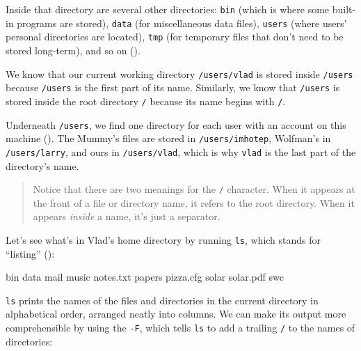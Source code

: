 \documentclass{book}
\begin{document}
Inside that directory are several other directories: \texttt{bin} (which
is where some built-in programs are stored), \texttt{data} (for
miscellaneous data files), \texttt{users} (where users' personal
directories are located), \texttt{tmp} (for temporary files that don't
need to be stored long-term), and so on ().


We know that our current working directory \texttt{/users/vlad} is
stored inside \texttt{/users} because \texttt{/users} is the first part
of its name. Similarly, we know that \texttt{/users} is stored inside
the root directory \texttt{/} because its name begins with \texttt{/}.

Underneath \texttt{/users}, we find one directory for each user with an
account on this machine (). The Mummy's files are stored in
\texttt{/users/imhotep}, Wolfman's in \texttt{/users/larry}, and ours in
\texttt{/users/vlad}, which is why \texttt{vlad} is the last part of the
directory's name.


\begin{quote} %
Notice that there are two meanings for the \texttt{/} character. When it
appears at the front of a file or directory name, it refers to the root
directory. When it appears \emph{inside} a name, it's just a separator.
\end{quote}

Let's see what's in Vlad's home directory by running \texttt{ls}, which
stands for ``listing'' ():


\begin{VerbOut}
bin          data      mail       music
notes.txt    papers    pizza.cfg  solar
solar.pdf    swc
\end{VerbOut}


\texttt{ls} prints the names of the files and directories in the current
directory in alphabetical order, arranged neatly into columns. We can
make its output more comprehensible by using the
 \texttt{-F}, which tells
\texttt{ls} to add a trailing \texttt{/} to the names of directories:
\end{document}
